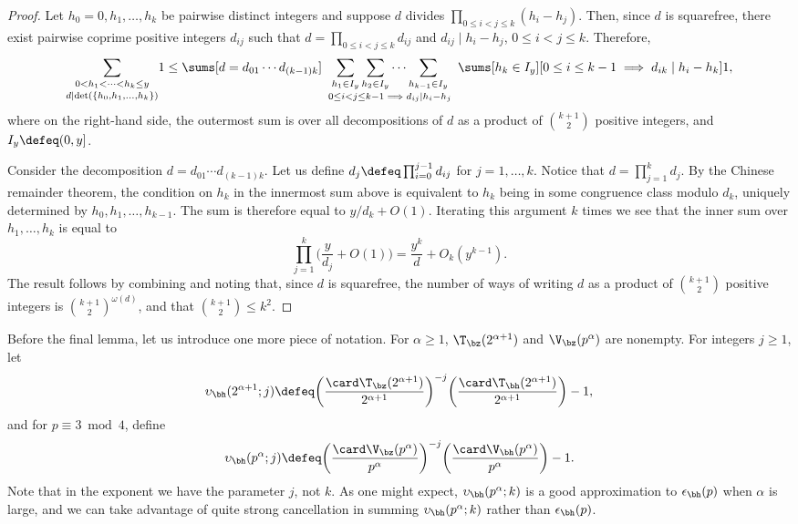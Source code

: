 \documentclass[12pt, reqno, twoside, letterpaper]{amsart}
\begin{document}
\begin{jetsam}
\begin{proof}
%
Let $h_0 = 0,h_1,\ldots,h_k$ be pairwise distinct integers and  
suppose $d$ divides $\prod_{0 \le i < j \le k}(h_i - h_j)$.
%
Then, since $d$ is squarefree, there exist pairwise coprime 
positive integers $d_{ij}$ such that 
$d = \prod_{0 \le i < j \le k} d_{ij}$ and 
$d_{ij} \mid h_i - h_j$, $0 \le i < j \le k$.
%
Therefore, 
\[
 \underset{d \mid \det(\{h_0,h_1,\ldots,h_k\})}
  { 
   \sum_{0 < h_1 < \cdots < h_k \le y}
  } 1
   \le 
    \sums[d = d_{01}\cdots d_{(k-1)k}] 
     \hspace{5pt}
     \underset{0 \le i < j \le k - 1 \implies d_{ij} \mid h_i - h_j}
    { 
       \sum_{h_1 \in I_y}
        \sum_{h_2 \in I_y}
         \cdots 
          \sum_{h_{k - 1} \in I_y}
    } 
     \hspace{5pt}
      \sums[h_k \in I_y][0 \le i \le k - 1 \implies d_{ik} \mid h_i - h_k] 1,
\]
where on the right-hand side, the outermost sum is over all 
decompositions of $d$ as a product of $\binom{k + 1}{2}$ positive 
integers, and $I_y \defeq (0,y]$.

Consider the decomposition $d = d_{01}\cdots d_{(k - 1)k}$.
%
Let us define $d_{j} \defeq \prod_{i = 0}^{j - 1} d_{ij}$ for 
$j = 1,\ldots,k$.
%
Notice that $d = \prod_{j = 1}^k d_j$.
%
By the Chinese remainder theorem, the condition on $h_k$ in the 
innermost sum above is equivalent to $h_k$ being in some 
congruence class modulo $d_k$, uniquely determined by 
$h_0,h_1,\ldots,h_{k - 1}$.
%
The sum is therefore equal to $y/d_k + O(1)$.
%
Iterating this argument $k$ times we see that the inner sum over 
$h_1,\ldots,h_k$ is equal to  
\[
  \prod_{j = 1}^k
   \bigg(\frac{y}{d_j} + O(1)\bigg)
    =
     \frac{y^k}{d} + O_k(y^{k - 1}).
\]
%
The result follows by combining and noting that, since $d$ is 
squarefree, the number of ways of writing $d$ as a product of 
$\binom{k + 1}{2}$ positive integers is 
$\binom{k + 1}{2}^{\omega(d)}$, and that 
$\binom{k + 1}{2} \le k^2$.
\end{proof}

Before the final lemma, let us introduce one more piece of 
notation.
%
For $\alpha \ge 1$, $\T_{\bz}(2^{\alpha + 1})$ and 
$\V_{\bz}(p^{\alpha})$ are nonempty.
%
For integers $j \ge 1$, let  
\[
 \upsilon_{\bh}(2^{\alpha + 1};j) 
  \defeq 
   \bigg(\frac{\card \T_{\bz}(2^{\alpha + 1})}{2^{\alpha + 1}}\bigg)^{-j}
    \bigg(\frac{\card \T_{\bh}(2^{\alpha + 1})}{2^{\alpha + 1}}\bigg) - 1, 
\]
and for $p \equiv 3 \bmod 4$, define
\[
 \upsilon_{\bh}(p^{\alpha};j) 
  \defeq 
   \bigg(\frac{\card \V_{\bz}(p^{\alpha})}{p^{\alpha}}\bigg)^{-j}
    \bigg(\frac{\card \V_{\bh}(p^{\alpha})}{p^{\alpha}}\bigg) - 1.  
\]
%
Note that in the exponent we have the parameter $j$, not $k$.
%
As one might expect, $\upsilon_{\bh}(p^{\alpha};k)$ is a good 
approximation to $\epsilon_{\bh}(p)$ when $\alpha$ is large, and 
we can take advantage of quite strong cancellation in summing 
$\upsilon_{\bh}(p^{\alpha};k)$ rather than $\epsilon_{\bh}(p)$.


\end{jetsam}
\end{document}
